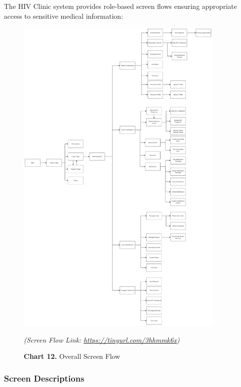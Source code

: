 \documentclass[12pt,a4paper]{article}
\begin{document}
The HIV Clinic system provides role-based screen flows ensuring appropriate access to sensitive medical information:


\begin{figure}[H]
    \centering
    \includegraphics[width=0.9\textwidth]{diagrams/Picture/ScreenFlow.png}
    \caption*{\textbf{Chart 12.} Overall Screen Flow}

    \vspace{0.5em}
    {\color{blue}\textit{(Screen Flow Link: \href{https://tinyurl.com/3hhmmk6x}{https://tinyurl.com/3hhmmk6x})}}
\end{figure}




\subsubsection{Screen Descriptions}
\end{document}
